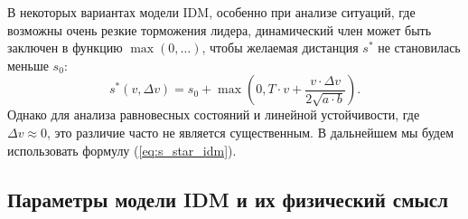 \documentclass[12pt, a4paper]{article}
\begin{document}
В некоторых вариантах модели IDM, особенно при анализе ситуаций, где возможны очень резкие торможения лидера, динамический член может быть заключен в функцию $\max(0, \dots)$, чтобы желаемая дистанция $s^*$ не становилась меньше $s_0$:
\[ s^*(v, \Delta v) = s_0 + \max\left(0, T \cdot v + \frac{v \cdot \Delta v}{2 \sqrt{a \cdot b}}\right). \]
Однако для анализа равновесных состояний и линейной устойчивости, где $\Delta v \approx 0$, это различие часто не является существенным. В дальнейшем мы будем использовать формулу (\ref{eq:s_star_idm}).

\subsection{Параметры модели IDM и их физический смысл}
\label{subsec:idm_parameters}
\end{document}

